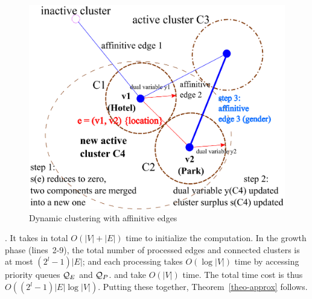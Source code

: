 \begin{figure}[tb!]
\centering
\centerline{\includegraphics[scale=0.38]{./fig/runningExampleABD_v2.eps}}
\vspace{-1ex}
\caption{Dynamic clustering with affinitive edges}
\label{fig:backbonemerge}
\vspace{-3ex}
\end{figure}



.
It takes in total $O(|V|+|E|)$ time to initialize
the computation. In the growth phase (lines~2-9),
the total number of processed edges and connected clusters
is at most $(2^l-1)|E|$; and each processing
takes $O(\log|V|)$ time by accessing priority queues
$\Q_E$ and $\Q_P$. \merge and  take
$O(|V|)$ time. The total time cost
is thus
$O((2^l-1)|E|\log|V|)$. Putting these together, Theorem~\ref{theo-approx}
follows.








